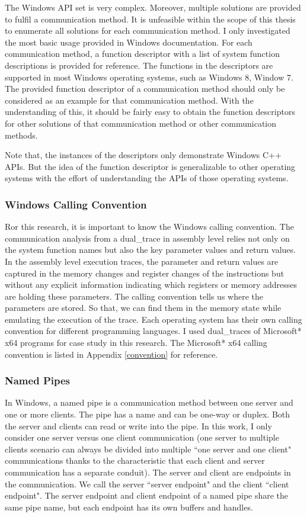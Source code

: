 The Windows API set is very complex. Moreover, multiple solutions are provided to fulfil a communication method. It is unfeasible within the scope of this thesis to enumerate all solutions for each communication method. I only investigated the most basic usage provided in Windows documentation. For each communication method, a function descriptor with a list of system function descriptions is provided for reference. The functions in the descriptors are supported in most Windows operating systems, such as Windows 8, Window 7. The provided function descriptor of a communication method should only be considered as an example for that communication method. With the understanding of this, it should be fairly easy to obtain the function descriptors for other solutions of that communication method or other communication methods. 

Note that, the instances of the descriptors only demonstrate Windows C++ APIs. But the idea of the function descriptor is generalizable to other operating systems with the effort of understanding the APIs of those operating systems.

\subsubsection{Windows Calling Convention}
Ror this research, it is important to know the Windows calling convention. The communication analysis from a dual\_trace in assembly level relies not only on the system function names but also the key parameter values and return values. In the assembly level execution traces, the parameter and return values are captured in the memory changes and register changes of the instructions but without any explicit information indicating which registers or memory addresses are holding these parameters. The calling convention tells us where the parameters are stored. So that, we can find them in the memory state while emulating the execution of the trace. Each operating system has their own calling convention for different programming languages. I used dual\_traces of Microsoft* x64 programs for case study in this research. The Microsoft* x64 calling convention is listed in Appendix \ref{convention} for reference.

\subsubsection{Named Pipes}
In Windows, a named pipe is a communication method between one server and one or more clients. The pipe has a name and can be one-way or duplex. Both the server and clients can read or write into the pipe\cite{WinNamedpipe}. In this work, I only consider one server versus one client communication (one server to multiple clients scenario can always be divided into multiple ``one server and one client" communications thanks to the characteristic that each client and server communication has a separate conduit). The server and client are endpoints in the communication. We call the server ``server endpoint" and the client ``client endpoint".  The server endpoint and client endpoint of a named pipe share the same pipe name, but each endpoint has its own buffers and handles. 

